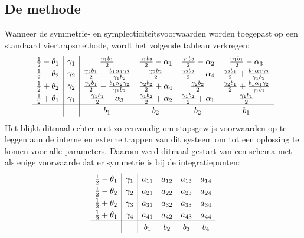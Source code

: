 \documentclass[12pt]{article}
\begin{document}
\subsection{De methode}
Wanneer de symmetrie- en symplecticiteitsvoorwaarden worden toegepast op een standaard viertrapsmethode, wordt het volgende tableau verkregen:
\begin{equation} \label{eq:rks4}
\renewcommand\arraystretch{1.2}
\begin{array}
{c|c|cccc}
\frac{1}{2}-\theta_1 & \gamma_1 & \frac{\gamma_1 b_1}{2} & \frac{\gamma_1 b_2}{2}-\alpha_1 & \frac{\gamma_1 b_2}{2}-\alpha_2 & \frac{\gamma_1 b_1}{2}-\alpha_3 \\
\frac{1}{2}-\theta_2 & \gamma_2 & \frac{\gamma_2 b_1}{2}-\frac{b_1\alpha_1\gamma_2}{\gamma_1b_2} & \frac{\gamma_2 b_2}{2} & \frac{\gamma_2 b_2}{2}-\alpha_4 & \frac{\gamma_2 b_1}{2}+\frac{b_1\alpha_2\gamma_2}{\gamma_1b_2} \\
\frac{1}{2}+\theta_2 & \gamma_2 & \frac{\gamma_2 b_1}{2}-\frac{b_1\alpha_2\gamma_2}{\gamma_1b_2} & \frac{\gamma_2 b_2}{2}+\alpha_4 & \frac{\gamma_2 b_2}{2} & \frac{\gamma_2 b_1}{2}+\frac{b_1\alpha_1\gamma_2}{\gamma_1b_2} \\
\frac{1}{2}+\theta_1 & \gamma_1 & \frac{\gamma_1 b_1}{2}+\alpha_3 & \frac{\gamma_1 b_2}{2}+\alpha_2 & \frac{\gamma_1 b_2}{2}+\alpha_1 & \frac{\gamma_1 b_1}{2} \\
\hline
&& b_1 & b_2 & b_2 & b_1 
\end{array}
\end{equation}
Het blijkt ditmaal echter niet zo eenvoudig om stapsgewijs voorwaarden op te leggen aan de interne en externe trappen van dit systeem om tot een oplossing te komen voor alle parameters. Daarom werd ditmaal gestart van een schema met als enige voorwaarde dat er symmetrie is bij de integratiepunten:
\begin{equation} \label{eq:rks4bis}
\renewcommand\arraystretch{1.2}
\begin{array}
{c|c|cccc}
\frac{1}{2}-\theta_1 & \gamma_1 & a_{11} & a_{12} & a_{13} & a_{14} \\
\frac{1}{2}-\theta_2 & \gamma_2 & a_{21} & a_{22} & a_{23} & a_{24} \\
\frac{1}{2}+\theta_2 & \gamma_3 & a_{31} & a_{32} & a_{33} & a_{34} \\
\frac{1}{2}+\theta_1 & \gamma_4 & a_{41} & a_{42} & a_{43} & a_{44} \\
\hline
&& b_1 & b_2 & b_3 & b_4 
\end{array}
\end{equation}
\end{document}
